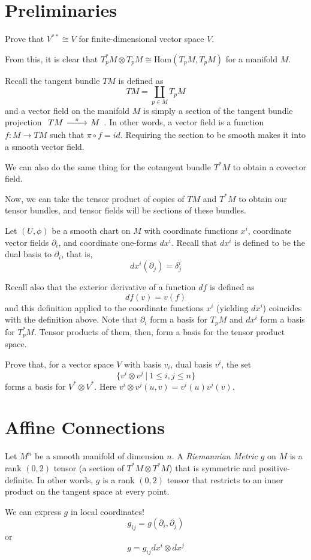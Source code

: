 \documentclass[../main.tex]{subfiles}
\begin{document}
\section{Preliminaries}

\begin{hw}
    Prove that $V^{**}\cong V$ for finite-dimensional vector space $V$.
\end{hw}

From this, it is clear that $T_p^*M\otimes T_pM\cong \textrm{Hom}(T_pM,T_pM)$
for a manifold $M$.

Recall the tangent bundle $TM$ is defined as
\[
    TM = \coprod_{p\in M} T_pM
\]
and a vector field on the manifold $M$ is simply a section of the tangent bundle
projection
$\begin{tikzcd}TM\arrow{r}{\pi} &M\end{tikzcd}$. In other words, a vector field
    is a function $f:M\to TM$ such that $\pi\circ f = id$.
Requiring the section to be smooth makes it into a smooth vector field.

We can also do the same thing for the cotangent bundle $T^*M$ to obtain a
covector field.

Now, we can take the tensor product of copies of $TM$ and $T^*M$ to obtain our
tensor bundles, and tensor fields will be sections of these bundles.

Let $(U,\phi)$ be a smooth chart on $M$ with coordinate functions $x^i$,
coordinate vector fields $\partial_i$, and coordinate one-forms $dx^i$. Recall
that $dx^i$ is defined to be the dual basis to $\partial_i$, that is,
\[
    dx^i(\partial_j) = \delta^i_j
\]

Recall also that the exterior derivative of a function $df$ is defined as
\[
    df(v) = v(f)
\]
and this definition applied to the coordinate functions $x^i$ (yielding $dx^i$)
coincides with the definition above. Note that $\partial_i$ form a basis for
$T_pM$ and $dx^i$ form a basis for $T_p^*M$. Tensor products of them, then, form
a basis for the tensor product space.

\begin{hw}
    Prove that, for a vector space $V$ with basis $v_i$, dual basis $v^i$, the
    set
    \[
        \{v^i\otimes v^j\ |\ 1\leq i,j\leq n\}
    \]
    forms a basis for $V^*\otimes V^*$. Here $v^i\otimes v^j(u,v) =
    v^i(u)v^j(v)$.
\end{hw}

\section{Affine Connections}

\begin{defn}
    Let $M^n$ be a smooth manifold of dimension $n$. A {\em Riemannian Metric}
    $g$ on $M$ is a rank $(0,2)$ tensor (a section of $T^*M\otimes T^*M$) that
    is symmetric and positive-definite. In other words, $g$ is a rank $(0,2)$
    tensor that restricts to an inner product on the tangent space at every
    point.
\end{defn}

We can express $g$ in local coordinates!
\[
    g_{ij} = g(\partial_i,\partial_j)
\]
or
\[
    g = g_{ij}dx^i\otimes dx^j
\]
\end{document}

